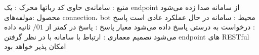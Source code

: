 
\begin{itemize}
 منبع : سامانه‌ی حاوی کد رباتها
 محرک : یک endpoint از سامانه صدا زده می‌شود	
 محصول :مولفه‌های connection، bot
 محیط : سامانه در حال عملکرد عادی است
 پاسخ : درخواست به درستی پاسخ داده می‌شود
 معیار پاسخ : پاسخ در کمتر از $/01$ ثانیه داده می‌شود
 تصمیم معماری : ارتباط با سامانه با در نظر گرفتن endpoint های RESTful امکان پذیر خواهد بود 
\end{itemize}



